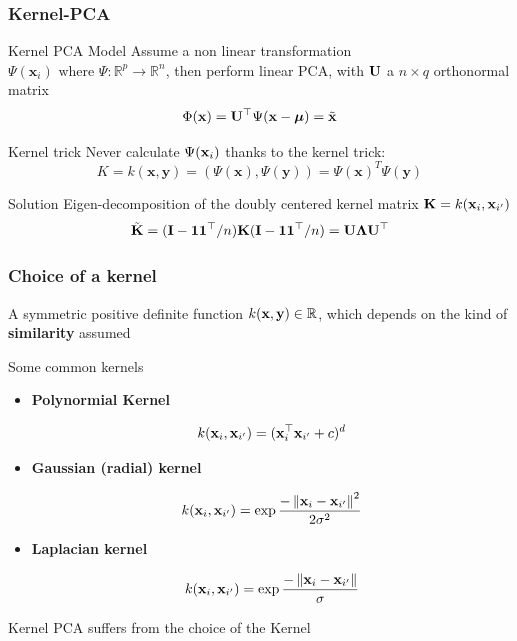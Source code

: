 \documentclass{beamer}\usepackage[]{graphicx}\usepackage[]{color}
\begin{document}
\begin{frame}
  \frametitle{Kernel-PCA}

  \begin{block}{Kernel PCA Model}
    Assume a non linear transformation $ \Psi(\mathbf{x}_i) \text{ where } \Psi : \mathbb{R}^p \to \mathbb{R}^n$,  then perform linear PCA, with $\mathbf{U}$ a \alert{\bf $n\times q$} orthonormal matrix
    \[
      \Phi(\mathbf{x}) = \mathbf{U}^\top \Psi(\mathbf{x}-\boldsymbol{\mu}) = \tilde{\mathbf{x}}
    \]
  \end{block}

  \begin{block}{Kernel trick}
    Never calculate  $\Psi(\mathbf{x}_i)$ thanks to the kernel trick:
    \[K = k(\mathbf{x},\mathbf{y}) = (\Psi(\mathbf{x}),\Psi(\mathbf{y})) = \Psi(\mathbf{x})^T\Psi(\mathbf{y}) \]
  \end{block}

  \begin{block}{Solution}
    Eigen-decomposition of the doubly centered kernel matrix $\mathbf{K} = k(\mathbf{x}_i, \mathbf{x}_{i'})$ 
    \[\tilde{\mathbf{K}} = 
    (\mathbf{I} - \mathbf{1}\mathbf{1}^\top/n) \mathbf{K} (\mathbf{I} - \mathbf{1}\mathbf{1}^\top/n) = \mathbf{U} {\boldsymbol\Lambda} \mathbf{U}^\top \]
  \end{block}

\end{frame}

\begin{frame}[fragile]
  \frametitle{Choice of a kernel} 

  A symmetric positive definite function $k(\mathbf{x},\mathbf{y}) \in \mathbb{R}$, which depends on the kind of \alert{\bf similarity} assumed

\begin{block}{Some common kernels}

\begin{itemize}
\item \alert{\bf Polynormial Kernel }

\[ k(\mathbf{x}_i,\mathbf{x}_{i'}) = (\mathbf{x}_{i}^\top \mathbf{x}_{i'} + c)^d \]

\item  \alert{\bf Gaussian (radial) kernel}

\[k(\mathbf{x}_i,\mathbf{x}_{i'}) = \exp{\frac {-\left\|\mathbf{x}_i - \mathbf{x}_{i'} \right\|^2}{2\sigma^2}}\]

\item  \alert{\bf Laplacian kernel}

\[k(\mathbf{x}_i,\mathbf{x}_{i'}) = \exp{\frac {-\left\|\mathbf{x}_i - \mathbf{x}_{i'} \right\|}{\sigma}}\]

\end{itemize}
\end{block}

\rsa Kernel PCA suffers from the choice of the Kernel

\end{frame}
\end{document}
